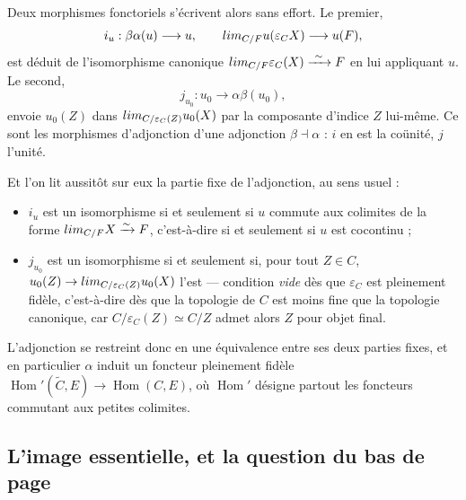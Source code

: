 \documentclass[11pt,a4paper]{article}
\begin{document}
Deux morphismes fonctoriels s'écrivent alors sans effort. Le premier,
\[
i_{u} : \beta\alpha(u) \longrightarrow u,
\qquad
\varinjlim_{C/F} u(\varepsilon_{C}X) \longrightarrow u(F),
\]
est déduit de l'isomorphisme canonique
$\varinjlim_{C/F} \varepsilon_{C}(X) \xrightarrow{\ \sim\ } F$ en lui
appliquant $u$. Le second,
\[
j_{u_{0}} : u_{0} \longrightarrow \alpha\beta(u_{0}),
\]
envoie $u_{0}(Z)$ dans $\varinjlim_{C/\varepsilon_{C}(Z)} u_{0}(X)$ par la
composante d'indice $Z$ lui-même. Ce sont les morphismes d'adjonction d'une
adjonction $\beta \dashv \alpha$ : $i$ en est la coünité, $j$ l'unité.

Et l'on lit aussitôt sur eux la partie fixe de l'adjonction, au sens usuel :

\begin{itemize}
\item $i_{u}$ est un isomorphisme si et seulement si $u$ commute aux colimites
de la forme $\varinjlim_{C/F} X \xrightarrow{\sim} F$, c'est-à-dire si et
seulement si $u$ est cocontinu ;
\item $j_{u_{0}}$ est un isomorphisme si et seulement si, pour tout
$Z \in C$, $u_{0}(Z) \to \varinjlim_{C/\varepsilon_{C}(Z)} u_{0}(X)$ l'est —
condition \emph{vide} dès que $\varepsilon_{C}$ est pleinement fidèle,
c'est-à-dire dès que la topologie de $C$ est moins fine que la topologie
canonique, car $C/\varepsilon_{C}(Z) \simeq C/Z$ admet alors $Z$ pour objet
final.
\end{itemize}

L'adjonction se restreint donc en une équivalence entre ses deux parties fixes,
et en particulier $\alpha$ induit un foncteur pleinement fidèle
$\operatorname{Hom}'(\widetilde{C}, E) \to \operatorname{Hom}(C, E)$, où
$\operatorname{Hom}'$ désigne partout les foncteurs commutant aux petites
colimites.

\subsection*{L'image essentielle, et la question du bas de page}
\end{document}
